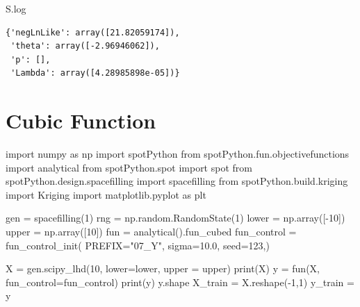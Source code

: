 \documentclass[
  letterpaper,
  DIV=11,
  numbers=noendperiod]{scrreprt}
\newenvironment{Shaded}{\begin{snugshade}}{\end{snugshade}}
\newcommand{\BuiltInTok}[1]{\textcolor[rgb]{0.00,0.23,0.31}{#1}}
\newcommand{\DecValTok}[1]{\textcolor[rgb]{0.68,0.00,0.00}{#1}}
\newcommand{\FloatTok}[1]{\textcolor[rgb]{0.68,0.00,0.00}{#1}}
\newcommand{\ImportTok}[1]{\textcolor[rgb]{0.00,0.46,0.62}{#1}}
\newcommand{\NormalTok}[1]{\textcolor[rgb]{0.00,0.23,0.31}{#1}}
\newcommand{\OperatorTok}[1]{\textcolor[rgb]{0.37,0.37,0.37}{#1}}
\newcommand{\StringTok}[1]{\textcolor[rgb]{0.13,0.47,0.30}{#1}}
\begin{document}
\begin{Shaded}
\begin{Highlighting}[]
\NormalTok{S.log}
\end{Highlighting}
\end{Shaded}

\begin{verbatim}
{'negLnLike': array([21.82059174]),
 'theta': array([-2.96946062]),
 'p': [],
 'Lambda': array([4.28985898e-05])}
\end{verbatim}

\section{Cubic Function}\label{cubic-function}

\begin{Shaded}
\begin{Highlighting}[]
\ImportTok{import}\NormalTok{ numpy }\ImportTok{as}\NormalTok{ np}
\ImportTok{import}\NormalTok{ spotPython}
\ImportTok{from}\NormalTok{ spotPython.fun.objectivefunctions }\ImportTok{import}\NormalTok{ analytical}
\ImportTok{from}\NormalTok{ spotPython.spot }\ImportTok{import}\NormalTok{ spot}
\ImportTok{from}\NormalTok{ spotPython.design.spacefilling }\ImportTok{import}\NormalTok{ spacefilling}
\ImportTok{from}\NormalTok{ spotPython.build.kriging }\ImportTok{import}\NormalTok{ Kriging}
\ImportTok{import}\NormalTok{ matplotlib.pyplot }\ImportTok{as}\NormalTok{ plt}

\NormalTok{gen }\OperatorTok{=}\NormalTok{ spacefilling(}\DecValTok{1}\NormalTok{)}
\NormalTok{rng }\OperatorTok{=}\NormalTok{ np.random.RandomState(}\DecValTok{1}\NormalTok{)}
\NormalTok{lower }\OperatorTok{=}\NormalTok{ np.array([}\OperatorTok{{-}}\DecValTok{10}\NormalTok{])}
\NormalTok{upper }\OperatorTok{=}\NormalTok{ np.array([}\DecValTok{10}\NormalTok{])}
\NormalTok{fun }\OperatorTok{=}\NormalTok{ analytical().fun\_cubed}
\NormalTok{fun\_control }\OperatorTok{=}\NormalTok{ fun\_control\_init(}
\NormalTok{    PREFIX}\OperatorTok{=}\StringTok{"07\_Y"}\NormalTok{,}
\NormalTok{    sigma}\OperatorTok{=}\FloatTok{10.0}\NormalTok{,}
\NormalTok{    seed}\OperatorTok{=}\DecValTok{123}\NormalTok{,)}

\NormalTok{X }\OperatorTok{=}\NormalTok{ gen.scipy\_lhd(}\DecValTok{10}\NormalTok{, lower}\OperatorTok{=}\NormalTok{lower, upper }\OperatorTok{=}\NormalTok{ upper)}
\BuiltInTok{print}\NormalTok{(X)}
\NormalTok{y }\OperatorTok{=}\NormalTok{ fun(X, fun\_control}\OperatorTok{=}\NormalTok{fun\_control)}
\BuiltInTok{print}\NormalTok{(y)}
\NormalTok{y.shape}
\NormalTok{X\_train }\OperatorTok{=}\NormalTok{ X.reshape(}\OperatorTok{{-}}\DecValTok{1}\NormalTok{,}\DecValTok{1}\NormalTok{)}
\NormalTok{y\_train }\OperatorTok{=}\NormalTok{ y}


\end{Highlighting}
\end{Shaded}
\end{document}
